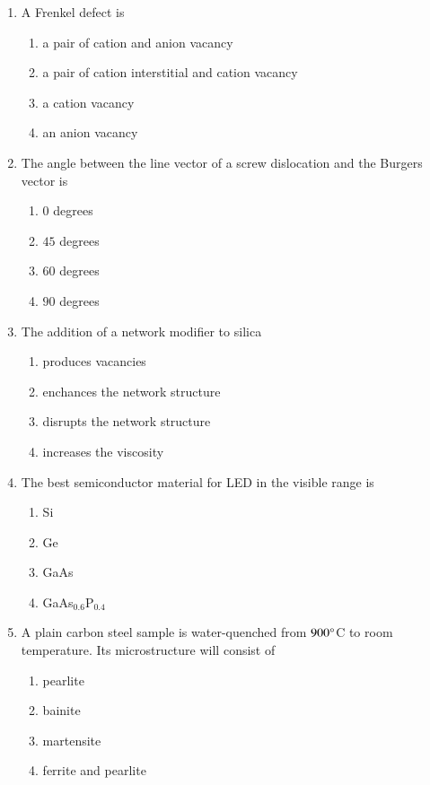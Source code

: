 \documentclass[journal,12pt,onecolumn]{IEEEtran}
\theoremstyle{remark}
\begin{document}
\begin{enumerate}
\item A Frenkel defect is

\begin{enumerate}
	\item a pair of cation and anion vacancy
	\item a pair of cation interstitial and cation vacancy
	\item a cation vacancy
	\item an anion vacancy
\end{enumerate}

\item The angle between the line vector of a screw dislocation and the Burgers vector is

\begin{enumerate}
	\item $0$ degrees
	\item $45$ degrees
	\item $60$ degrees
	\item $90$ degrees
\end{enumerate}

\item The addition of a network modifier to silica

\begin{enumerate}
	\item produces vacancies
	\item enchances the network structure
	\item disrupts the network structure
	\item increases the viscosity
\end{enumerate}

\item The best semiconductor material for LED in the visible range is

\begin{enumerate}
	\item Si
	\item Ge
	\item GaAs
	\item GaAs$_0.6$P$_0.4$
\end{enumerate}

\item A plain carbon steel sample is water-quenched from $900\degree$C to room temperature. Its microstructure will consist of

\begin{enumerate}
	\item pearlite
	\item bainite
	\item martensite
	\item ferrite and pearlite
\end{enumerate}


\end{enumerate}
\end{document}

